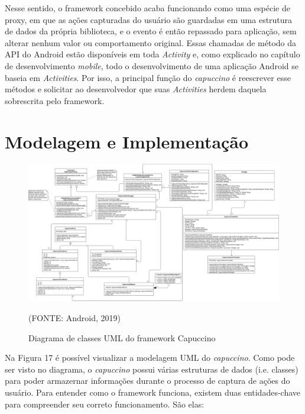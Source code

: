 \documentclass[
    12pt,       %
    openright,      %
    twoside,      %
    a4paper,      %
    english,      %
    french,       %
    spanish,      %
    brazil,       %
    ]{abntex2}
\begin{document}
        Nesse sentido, o framework concebido acaba funcionando como uma espécie de proxy, em que as
        ações capturadas do usuário são guardadas em uma estrutura de dados da própria biblioteca, e o
        evento é então repassado para aplicação, sem alterar nenhum valor ou comportamento
        original. Essas chamadas de método da API do Android estão disponíveis em toda \textit{Activity}
        e, como explicado no capítulo de desenvolvimento \textit{mobile}, todo o desenvolvimento de uma aplicação
        Android se baseia em \textit{Activities}. Por isso, a principal função do \textit{capuccino} é
        reescrever esse métodos e solicitar ao desenvolvedor que suas \textit{Activities} herdem daquela
        sobrescrita pelo framework.

        \section{Modelagem e Implementação}
          \begin{figure}
              \begin{center}
                \includegraphics[width=1.0\textwidth]{img/capuccinoDiagram.png}
                \caption{Diagrama de classes UML do framework Capuccino}
                \label{fig:PropProf}
                \begin{center}(FONTE: Android, 2019)\end{center}
              \end{center}
          \end{figure}

          Na Figura 17 é possível visualizar a modelagem UML do \textit{capuccino}. Como pode ser
          visto no diagrama, o \textit{capuccino} possui várias estruturas de dados (i.e. classes)
          para poder armazernar informações durante o processo de captura de ações do usuário.
          Para entender como o framework funciona, existem duas entidades-chave para compreender
          seu correto funcionamento. São elas:
\end{document}
